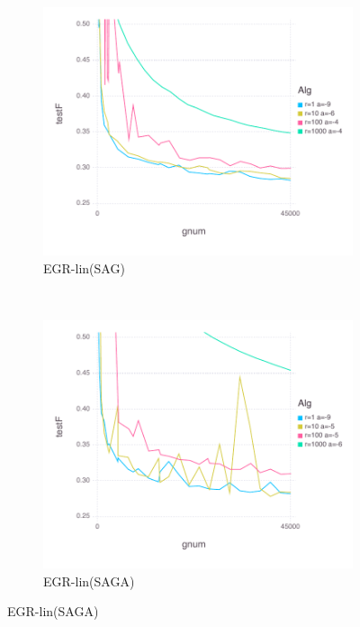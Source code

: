 \documentclass[11pt]{article}
\begin{document}
   \begin{figure}[H]
       \centering
\begin{subfigure}[b]{0.45\textwidth}
           \includegraphics[width=\textwidth]{Figures/MNISTBLtrueffFinal-linfalse.pdf}
           \caption{EGR-lin(SAG)}
       \end{subfigure}
       ~ %
       \begin{subfigure}[b]{0.45\textwidth}
           \includegraphics[width=\textwidth]{Figures/MNISTBLtrueffFinal-lintrue.pdf}
           \caption{EGR-lin(SAGA)} 
       \end{subfigure}
	   

\end{figure}
\end{document}
